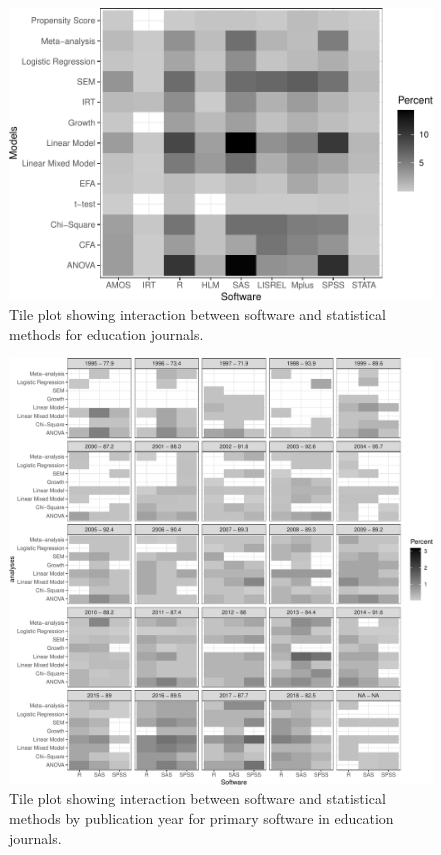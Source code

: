 \documentclass[
  english,
  ,man]{apa7}
\begin{document}
\begin{figure}
\centering
\includegraphics{software_files/figure-latex/software-statmethods-1.pdf}
\caption{\label{fig:software-statmethods}Tile plot showing interaction between software and statistical methods for education journals.}
\end{figure}

\begin{figure}
\centering
\includegraphics{software_files/figure-latex/software-statmethods-year-1.pdf}
\caption{\label{fig:software-statmethods-year}Tile plot showing interaction between software and statistical methods by publication year for primary software in education journals.}
\end{figure}
\end{document}

